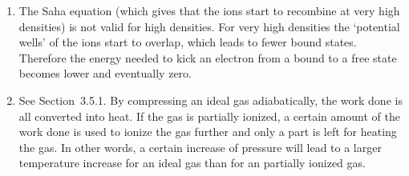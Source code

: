 \documentclass[11pt,a4paper]{report}
\begin{document}
\begin{enumerate}
\begin{enumerate}
    
  \item The Saha equation (which gives that the ions start to
    recombine at very high densities) is not valid for high densities.
    For very high densities the `potential wells' of the ions start to
    overlap, which leads to fewer bound states. Therefore the energy
    needed to kick an electron from a bound to a free state becomes
    lower and eventually zero.
	
  \item See Section~3.5.1. By compressing an ideal gas adiabatically,
    the work done is all converted into heat. If the gas is partially
    ionized, a certain amount of the work done is used to ionize the
    gas further and only a part is left for heating the gas. In other
    words, a certain increase of pressure will lead to a larger
    temperature increase for an ideal gas than for an partially
    ionized gas.
    
    
    
\end{enumerate}
  


 \end{enumerate}
\end{document}
